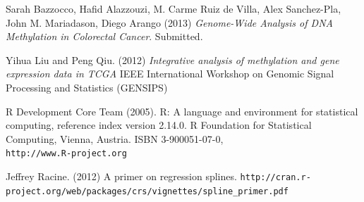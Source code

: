\documentclass[a4paper,10pt]{article}\usepackage[]{graphicx}\usepackage[]{color}
\begin{document}

\clearpage
\begin{thebibliography}{9}


 Sarah Bazzocco, Hafid Alazzouzi, M. Carme Ruiz de Villa, Alex Sanchez-Pla, John M. Mariadason, Diego Arango (2013) \emph{Genome-Wide Analysis of DNA Methylation in Colorectal Cancer}. Submitted.

 Yihua Liu and Peng Qiu. (2012) \emph{Integrative analysis of methylation and gene expression data in TCGA} IEEE International Workshop on Genomic Signal Processing and Statistics (GENSIPS)

 R Development Core Team (2005). R: A language and environment for statistical computing,  reference index version 2.14.0. R Foundation for Statistical Computing, Vienna, Austria. ISBN 3-900051-07-0, \\
  \verb|http://www.R-project.org|

 Jeffrey Racine. (2012) A primer on regression splines.\newline
\verb|http://cran.r-project.org/web/packages/crs/vignettes/spline_primer.pdf|

\end{thebibliography}
\end{document}
